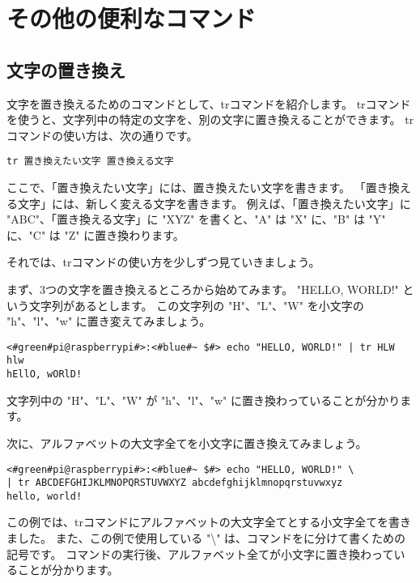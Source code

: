 \section{その他の便利なコマンド}

\subsection{文字の置き換え}
文字を置き換えるためのコマンドとして、trコマンドを紹介します。
trコマンドを使うと、文字列中の特定の文字を、別の文字に置き換えることができます。
trコマンドの使い方は、次の通りです。

\begin{lstlisting}[caption=trコマンドの使い方, label=tr_basic_usage]
tr 置き換えたい文字 置き換える文字
\end{lstlisting}

ここで、「置き換えたい文字」には、置き換えたい文字を書きます。
「置き換える文字」には、新しく変える文字を書きます。
例えば、「置き換えたい文字」に "ABC"、「置き換える文字」に "XYZ" を書くと、"A" は "X" に、"B" は "Y" に、"C" は "Z"
に置き換わります。

それでは、trコマンドの使い方を少しずつ見ていきましょう。

まず、3つの文字を置き換えるところから始めてみます。
"HELLO, WORLD!" という文字列があるとします。
この文字列の "H"、"L"、"W" を小文字の "h"、"l"、"w" に置き変えてみましょう。

\begin{lstlisting}[caption=3文字の置き換え, label=tr_3_chars]
<#green#pi@raspberrypi#>:<#blue#~ $#> echo "HELLO, WORLD!" | tr HLW hlw
hEllO, wORlD!
\end{lstlisting}

文字列中の "H"、"L"、"W" が "h"、"l"、"w" に置き換わっていることが分かります。

次に、アルファベットの大文字全てを小文字に置き換えてみましょう。

\begin{lstlisting}[caption=アルファベット全体の置き換え, label=tr_all_chars]
<#green#pi@raspberrypi#>:<#blue#~ $#> echo "HELLO, WORLD!" \
| tr ABCDEFGHIJKLMNOPQRSTUVWXYZ abcdefghijklmnopqrstuvwxyz
hello, world!
\end{lstlisting}

この例では、trコマンドにアルファベットの大文字全てとする小文字全てを書きました。
また、この例で使用している "\textbackslash" は、コマンドをに分けて書くための記号です。
コマンドの実行後、アルファベット全てが小文字に置き換わっていることが分かります。

